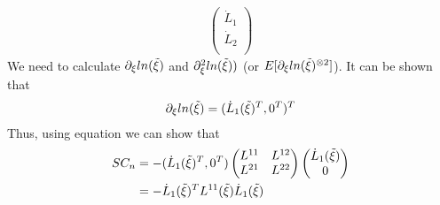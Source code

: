 \begin{itemize}
\begin{align*}
\begin{pmatrix}
            \dot{L}_1\\
           \dot{L}_2\\
         \end{pmatrix} 
\end{align*} 
We need to calculate $\partial_{\xi}ln(\Tilde{\xi})$ and $\partial_{\xi}^2 ln(\Tilde{\xi}))$ (or $E[\partial_{\xi}ln(\Tilde{\xi})^{\otimes 2}]$). It can be shown that 
\begin{align*}
\partial_{\xi}ln(\Tilde{\xi}) &= (\dot{L}_1(\Tilde{\xi})^T, 0^T)^T \\
\end{align*} 
Thus, using equation we can show that
\begin{align*}
SC_n &= - (\dot{L}_1(\Tilde{\xi})^T, 0^T) \begin{pmatrix}
            L^{11} & L^{12}\\
           L^{21} & L^{22}\\
         \end{pmatrix}  \begin{pmatrix}
            \dot{L}_1(\Tilde{\xi})\\
           0\\
         \end{pmatrix} \\
    &= -\dot{L}_1(\Tilde{\xi})^T L^{11}(\Tilde{\xi}) \dot{L}_1(\Tilde{\xi})
\end{align*} 


\end{itemize}
